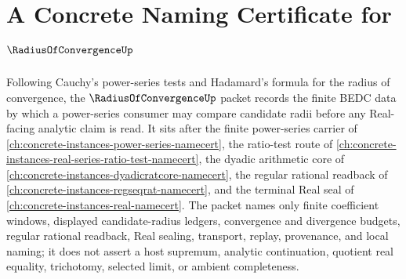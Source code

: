 \chapter{A Concrete Naming Certificate for $\RadiusOfConvergenceUp$}
\label{ch:concrete-instances-radius-of-convergence-namecert}

Following Cauchy's power-series tests and Hadamard's formula for the radius of convergence, the $\RadiusOfConvergenceUp$ packet records the finite BEDC data by which a power-series consumer may compare candidate radii before any Real-facing analytic claim is read. It sits after the finite power-series carrier of \autoref{ch:concrete-instances-power-series-namecert}, the ratio-test route of \autoref{ch:concrete-instances-real-series-ratio-test-namecert}, the dyadic arithmetic core of \autoref{ch:concrete-instances-dyadicratcore-namecert}, the regular rational readback of \autoref{ch:concrete-instances-regseqrat-namecert}, and the terminal Real seal of \autoref{ch:concrete-instances-real-namecert}. The packet names only finite coefficient windows, displayed candidate-radius ledgers, convergence and divergence budgets, regular rational readback, Real sealing, transport, replay, provenance, and local naming; it does not assert a host supremum, analytic continuation, quotient real equality, trichotomy, selected limit, or ambient completeness.

